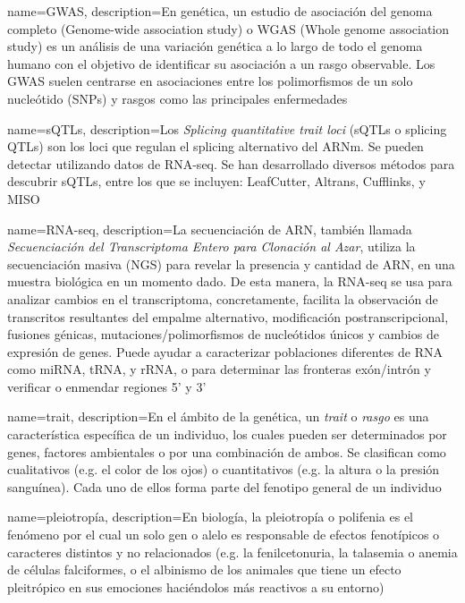   {name=GWAS,
   description={En genética, un estudio de asociación del genoma completo (Genome-wide association study) o WGAS (Whole genome association study) es un análisis de una variación genética a lo largo de todo el genoma humano con el objetivo de identificar su asociación a un rasgo observable. Los GWAS suelen centrarse en asociaciones entre los polimorfismos de un solo nucleótido (SNPs) y rasgos como las principales enfermedades}
  }
  
  {name=sQTLs,
   description={Los \textit{Splicing quantitative trait loci} (sQTLs o splicing QTLs) son los loci que regulan el splicing alternativo del ARNm. Se pueden detectar utilizando datos de RNA-seq. Se han desarrollado diversos métodos para descubrir sQTLs, entre los que se incluyen: LeafCutter, Altrans, Cufflinks, y MISO}
  }
  
  {name=RNA-seq,
   description={La secuenciación de ARN, también llamada \textit{Secuenciación del Transcriptoma Entero para Clonación al Azar}, utiliza la secuenciación masiva (NGS) para revelar la presencia y cantidad de ARN, en una muestra biológica en un momento dado. De esta manera, la RNA-seq se usa para analizar cambios en el transcriptoma, concretamente, facilita la observación de transcritos resultantes del empalme alternativo, modificación postranscripcional, fusiones génicas, mutaciones/polimorfismos de nucleótidos únicos y cambios de expresión de genes. Puede ayudar a caracterizar poblaciones diferentes de RNA como miRNA, tRNA, y rRNA, o para determinar las fronteras exón/intrón y verificar o enmendar regiones 5' y 3'}
  }

  {name=trait,
   description={En el ámbito de la genética, un \textit{trait} o \textit{rasgo} es una característica específica de un individuo, los cuales pueden ser determinados por genes, factores ambientales o por una combinación de ambos. Se clasifican como cualitativos (e.g. el color de los ojos) o cuantitativos (e.g. la altura o la presión sanguínea). Cada uno de ellos forma parte del fenotipo general de un individuo}
  }

  {name=pleiotropía,
   description={En biología, la pleiotropía o polifenia es el fenómeno por el cual un solo gen o alelo es responsable de efectos fenotípicos o caracteres distintos y no relacionados (e.g. la fenilcetonuria, la talasemia o anemia de células falciformes, o el albinismo de los animales que tiene un efecto pleitrópico en sus emociones haciéndolos más reactivos a su entorno)}
  }

